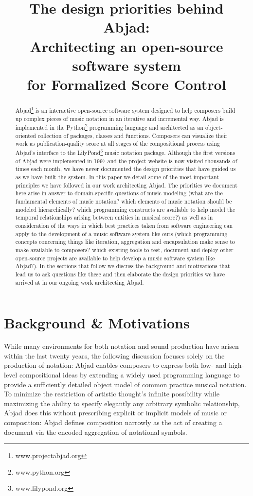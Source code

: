 \documentclass{article}
\title{The design priorities behind Abjad: \\ 
Architecting an open-source software system \\
for Formalized Score Control}
\begin{document}
\capstartfalse
\maketitle
\capstarttrue

\begin{abstract}
Abjad\footnote{www.projectabjad.org} is an interactive open-source software
system designed to help composers build up complex pieces of music notation in
an iterative and incremental way.  Abjad is implemented in the
Python\footnote{www.python.org} programming language and architected as an
object-oriented collection of packages, classes and functions. Composers can
visualize their work as publication-quality score at all stages of the
compositional process using Abjad's interface to the
LilyPond\footnote{www.lilypond.org} music notation package. Although the first
versions of Abjad were implemented in 1997 and the project website is now
visited thousands of times each month, we have never documented the design
priorities that have guided us as we have built the system. In this paper we
detail some of the most important principles we have followed in our work
architecting Abjad. The priorities we document here arise in answer to
domain-specific questions of music modeling (what are the fundamental elements
of music notation? which elements of music notation should be modeled
hierarchically? which programming constructs are available to help model the
temporal relationships arising between entities in musical score?) as well as
in consideration of the ways in which best practices taken from software
engineering can apply to the development of a music software system like ours
(which programming concepts concerning things like iteration, aggregation and
encapsulation make sense to make available to composers? which existing tools
to test, document and deploy other open-source projects are available to help
develop a music software system like Abjad?). In the sections that follow we
discuss the background and motivations that lead us to ask questions like these
and then elaborate the design priorities we have arrived at in our ongoing work
architecting Abjad.
\end{abstract}

\section{Background \& Motivations} \label{sec:background}

While many environments for both notation and sound production have arisen
within the last twenty years, the following discussion focuses solely on the
production of notation: Abjad enables composers to express both low- and
high-level compositional ideas by extending a widely used programming language
to provide a sufficiently detailed object model of common practice musical
notation. To minimize the restriction of artistic thought's infinite
possibility while maximizing the ability to specify elegantly any arbitrary
symbolic relationship, Abjad does this without prescribing explicit or implicit
models of music or composition: Abjad defines composition narrowly as the act
of creating a document via the encoded aggregation of notational symbols.
\end{document}
